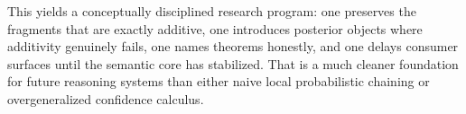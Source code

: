 \documentclass[11pt]{article}
\begin{document}
This yields a conceptually disciplined research program: one preserves the
fragments that are exactly additive, one introduces posterior objects where
additivity genuinely fails, one names theorems honestly, and one delays
consumer surfaces until the semantic core has stabilized.  That is a much
cleaner foundation for future reasoning systems than either naive local
probabilistic chaining or overgeneralized confidence calculus.
\end{document}

